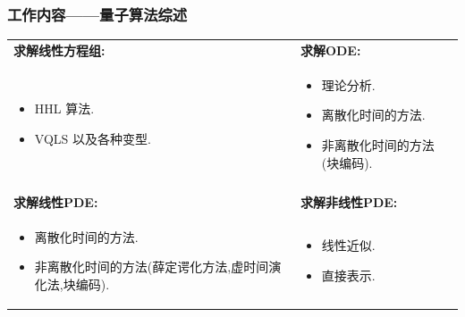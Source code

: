 \documentclass{beamer}
\begin{document}
\begin{spacing}{1.2}
{  \begin{frame}
  	\frametitle{工作内容——量子算法综述}
  	\begin{tabular}{p{} p{}}
  		\textbf{求解线性方程组:} &
  		\textbf{求解ODE:} \\ \hspace{-18pt}
  		\begin{minipage}[t]{0.5\textwidth}
  			\begin{itemize}
  				\item HHL 算法.
  				\item VQLS 以及各种变型.
  			\end{itemize}
  		\end{minipage} &\hspace{-18pt}
  		\begin{minipage}[t]{0.5\textwidth}
  			\begin{itemize}
  				\item 理论分析.
  				\item 离散化时间的方法.
  				\item 非离散化时间的方法(块编码).
  			\end{itemize}
  		\end{minipage} \\  	  
  	     \vspace{15pt} \\  
  		\textbf{求解线性PDE:} &
  		\textbf{求解非线性PDE:} \\ 
  		\hspace{-18pt}
  		\begin{minipage}[t]{0.5\textwidth}
  			\begin{itemize}
  				\item 离散化时间的方法.
  				\item 非离散化时间的方法(薛定谔化方法,虚时间演化法,块编码).
  			\end{itemize}
  		\end{minipage} &
  		\hspace{-18pt}
  		\begin{minipage}[t]{0.5\textwidth}
  			\begin{itemize}
  				\item 线性近似.
  				\item 直接表示.
  			\end{itemize}
  		\end{minipage}
  	\end{tabular}
  \end{frame}

}
\end{spacing}
\end{document}
